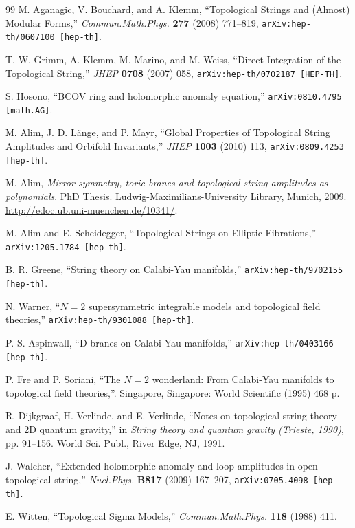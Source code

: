 \begin{thebibliography}{99}
M. Aganagic, V. Bouchard, and A. Klemm, ``Topological Strings and (Almost) Modular Forms,''
\textit{Commun.Math.Phys.} \textbf{277} (2008) 771--819,
\texttt{arXiv:hep-th/0607100 [hep-th]}.

T. W. Grimm, A. Klemm, M. Marino, and M. Weiss, ``Direct Integration of the Topological
String,'' \textit{JHEP} \textbf{0708} (2007) 058,
\texttt{arXiv:hep-th/0702187 [HEP-TH]}.

S. Hosono, ``BCOV ring and holomorphic anomaly equation,''
\texttt{arXiv:0810.4795 [math.AG]}.

M. Alim, J. D. L\"ange, and P. Mayr, ``Global Properties of Topological String Amplitudes
and Orbifold Invariants,'' \textit{JHEP} \textbf{1003} (2010) 113,
\texttt{arXiv:0809.4253 [hep-th]}.

M. Alim, \textit{Mirror symmetry, toric branes and topological string amplitudes as
polynomials}. PhD Thesis. Ludwig-Maximilians-University Library, Munich, 2009.
\url{http://edoc.ub.uni-muenchen.de/10341/}.

M. Alim and E. Scheidegger, ``Topological Strings on Elliptic Fibrations,''
\texttt{arXiv:1205.1784 [hep-th]}.

B. R. Greene, ``String theory on Calabi-Yau manifolds,''
\texttt{arXiv:hep-th/9702155 [hep-th]}.

N. Warner, ``$N=2$ supersymmetric integrable models and topological field theories,''
\texttt{arXiv:hep-th/9301088 [hep-th]}.

P. S. Aspinwall, ``D-branes on Calabi-Yau manifolds,''
\texttt{arXiv:hep-th/0403166 [hep-th]}.

P. Fre and P. Soriani, ``The $N=2$ wonderland: From Calabi-Yau manifolds to topological
field theories,''. Singapore, Singapore: World Scientific (1995) 468 p.

R. Dijkgraaf, H. Verlinde, and E. Verlinde, ``Notes on topological string theory and 2D
quantum gravity,'' in \textit{String theory and quantum gravity (Trieste, 1990)},
pp. 91--156. World Sci. Publ., River Edge, NJ, 1991.

J. Walcher, ``Extended holomorphic anomaly and loop amplitudes in open topological
string,'' \textit{Nucl.Phys.} \textbf{B817} (2009) 167--207,
\texttt{arXiv:0705.4098 [hep-th]}.

E. Witten, ``Topological Sigma Models,'' \textit{Commun.Math.Phys.} \textbf{118} (1988) 411.


\end{thebibliography}
